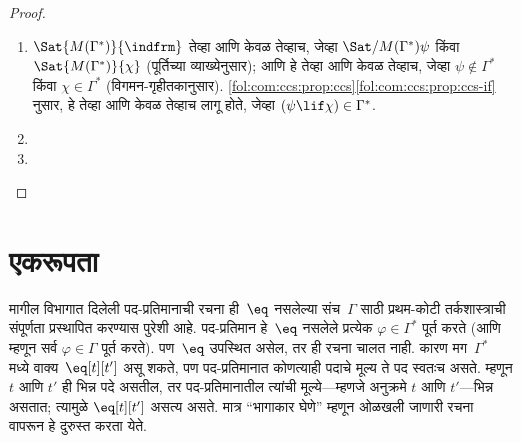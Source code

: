 \begin{proof}
\begin{enumerate}
\item

  \indcase{\varphi}{\psi \lif \chi}
    {$\Sat{M(\Gamma^*)}{\indfrm}$
    तेव्हा आणि केवळ तेव्हाच, जेव्हा
    $\Sat/{M(\Gamma^*)}{\psi}$ किंवा $\Sat{M (\Gamma^*)}{\chi}$
    (पूर्तिच्या व्याख्येनुसार); आणि हे तेव्हा आणि केवळ तेव्हाच, जेव्हा
    $\psi \notin \Gamma^*$ किंवा $\chi \in \Gamma^*$ (विगमन-गृहीतकानुसार).
    \ref{fol:com:ccs:prop:ccs}\ref{fol:com:ccs:prop:ccs-if} नुसार, हे तेव्हा आणि
    केवळ तेव्हाच लागू होते, जेव्हा $(\psi \lif \chi) \in \Gamma^*$.}


\item



\item



\end{enumerate}
\end{proof}
















\section{एकरूपता}\label{fol:com:ide:sec}

\begin{explain}
मागील विभागात दिलेली पद-प्रतिमानाची रचना ही~$\eq$ नसलेल्या
संच~$\Gamma$ साठी प्रथम-कोटी तर्कशास्त्राची संपूर्णता प्रस्थापित करण्यास
पुरेशी आहे. पद-प्रतिमान हे~$\eq$ नसलेले प्रत्येक $\varphi \in \Gamma^*$
पूर्त करते (आणि म्हणून सर्व $\varphi \in \Gamma$ पूर्त करते). पण~$\eq$
उपस्थित असेल, तर ही रचना चालत नाही. कारण मग~$\Gamma^*$ मध्ये
वाक्य~$\eq[t][t']$ असू शकते, पण पद-प्रतिमानात कोणत्याही पदाचे
मूल्य ते पद स्वतःच असते. म्हणून $t$ आणि $t'$ ही भिन्न पदे असतील, तर
पद-प्रतिमानातील त्यांची मूल्ये---म्हणजे अनुक्रमे $t$ आणि $t'$---भिन्न
असतात; त्यामुळे $\eq[t][t']$ असत्य असते. मात्र ``भागाकार घेणे'' म्हणून
ओळखली जाणारी रचना वापरून हे दुरुस्त करता येते.
\end{explain}

